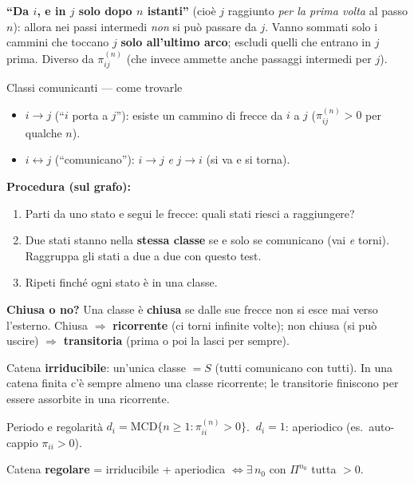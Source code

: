 \documentclass[11pt]{article}
\begin{document}
\begin{attenzione}
\textbf{``Da $i$, e in $j$ solo dopo $n$ istanti''} (cio\`e $j$ raggiunto \emph{per la prima volta} al passo $n$): allora nei passi intermedi \emph{non} si pu\`o passare da $j$. Vanno sommati solo i cammini che toccano $j$ \textbf{solo all'ultimo arco}; escludi quelli che entrano in $j$ prima. Diverso da $\pi_{ij}^{(n)}$ (che invece ammette anche passaggi intermedi per $j$).
\end{attenzione}

\begin{concetto}[barPurple]{Classi comunicanti --- come trovarle}
\begin{itemize}[leftmargin=1.2em,itemsep=2pt,topsep=2pt]
\item $i\to j$ (``$i$ porta a $j$''): esiste un cammino di frecce da $i$ a $j$ ($\pi_{ij}^{(n)}>0$ per qualche $n$).
\item $i\leftrightarrow j$ (``comunicano''): $i\to j$ \emph{e} $j\to i$ (si va e si torna).
\end{itemize}
\textbf{Procedura (sul grafo):}
\begin{enumerate}[leftmargin=1.4em,itemsep=1pt,topsep=2pt]
\item Parti da uno stato e segui le frecce: quali stati riesci a raggiungere?
\item Due stati stanno nella \textbf{stessa classe} se e solo se comunicano (vai \emph{e} torni). Raggruppa gli stati a due a due con questo test.
\item Ripeti finch\'e ogni stato \`e in una classe.
\end{enumerate}
\textbf{Chiusa o no?} Una classe \`e \textbf{chiusa} se dalle sue frecce non si esce mai verso l'esterno. \; Chiusa $\Rightarrow$ \textbf{ricorrente} (ci torni infinite volte); non chiusa (si pu\`o uscire) $\Rightarrow$ \textbf{transitoria} (prima o poi la lasci per sempre).

Catena \textbf{irriducibile}: un'unica classe $=S$ (tutti comunicano con tutti). In una catena finita c'\`e sempre almeno una classe ricorrente; le transitorie finiscono per essere assorbite in una ricorrente.
\end{concetto}

\begin{concetto}[barPurple]{Periodo e regolarit\`a}
$d_i = \mathrm{MCD}\{n\ge1:\pi_{ii}^{(n)}>0\}$. $\ d_i=1$: aperiodico (es.\ auto-cappio $\pi_{ii}>0$).

Catena \textbf{regolare} = irriducibile + aperiodica $\iff \exists\, n_0$ con $\Pi^{n_0}$ tutta $>0$.
\end{concetto}
\end{document}
